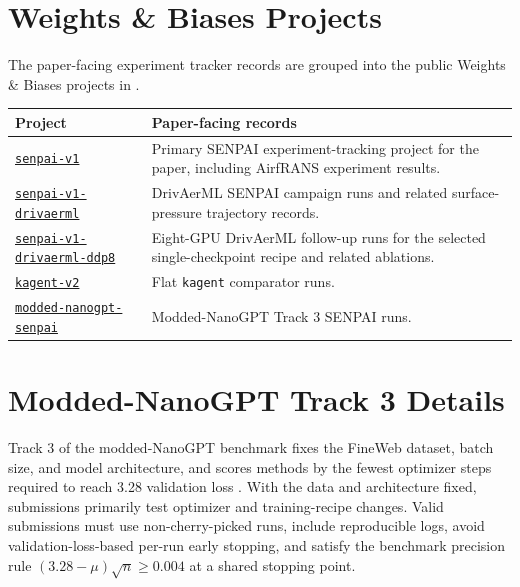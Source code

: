 \documentclass{article}
\begin{document}
\section{Weights \& Biases Projects}
\label{app:wandb-projects}

The paper-facing experiment tracker records are grouped into the public Weights \& Biases projects in .

\begin{center}
  \label{tab:wandb-projects}
  \small
  \begin{tabular}{@{}p{}p{}@{}}
    \toprule
    Project & Paper-facing records \\
    \midrule
    \href{https://wandb.ai/wandb-applied-ai-team/senpai-v1}{\texttt{senpai-v1}} & Primary SENPAI experiment-tracking project for the paper, including AirfRANS experiment results. \\
    \href{https://wandb.ai/wandb-applied-ai-team/senpai-v1-drivaerml}{\texttt{senpai-v1-drivaerml}} & DrivAerML SENPAI campaign runs and related surface-pressure trajectory records. \\
    \href{https://wandb.ai/wandb-applied-ai-team/senpai-v1-drivaerml-ddp8}{\texttt{senpai-v1-drivaerml-ddp8}} & Eight-GPU DrivAerML follow-up runs for the selected single-checkpoint recipe and related ablations. \\
    \href{https://wandb.ai/wandb-applied-ai-team/kagent-v2}{\texttt{kagent-v2}} & Flat \texttt{kagent} comparator runs. \\
    \href{https://wandb.ai/wandb-applied-ai-team/modded-nanogpt-senpai}{\texttt{modded-nanogpt-senpai}} & Modded-NanoGPT Track 3 SENPAI runs. \\
    \bottomrule
  \end{tabular}
\end{center}

\FloatBarrier

\section{Modded-NanoGPT Track 3 Details}
\label{app:modded-nanogpt-details}

Track 3 of the modded-NanoGPT benchmark fixes the FineWeb dataset, batch size, and model architecture, and scores methods by the fewest optimizer steps required to reach 3.28 validation loss \citep{penedo2024fineweb,karpathy2024llmcgpt2}. With the data and architecture fixed, submissions primarily test optimizer and training-recipe changes. Valid submissions must use non-cherry-picked runs, include reproducible logs, avoid validation-loss-based per-run early stopping, and satisfy the benchmark precision rule $(3.28-\mu)\sqrt{n}\ge 0.004$ at a shared stopping point.
\end{document}
